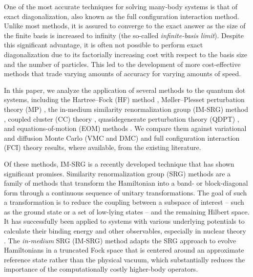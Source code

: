 One of the most accurate techniques for solving many-body systems is that of exact diagonalization, also known as the full configuration interaction method.  Unlike most methods, it is assured to converge to the exact answer as the size of the finite basis is increased to infinity (the so-called \textit{infinite-basis limit}).  Despite this significant advantage, it is often not possible to perform exact diagonalization due to its factorially increasing cost with respect to the basis size and the number of particles.  This led to the development of more cost-effective methods that trade varying amounts of accuracy for varying amounts of speed.

In this paper, we analyze the application of several methods to the quantum dot systems, including the Hartree--Fock (HF) method \cite{hartree_1928,Fock1930}, M\o ller--Plesset perturbation theory (MP) \cite{1934PhRv...46..618M}, the in-medium similarity renormalization group (IM-SRG) method \cite{IMSRG}, coupled cluster (CC) theory \cite{PhysRevB.67.045320,heidari:114708,PhysRevB.84.115302}, quasidegenerate perturbation theory (QDPT) \cite{0022-3700-7-18-010,Kvasnicka1974}, and equations-of-motion (EOM) methods \cite{RevModPhys.40.153}.  We compare them against variational and diffusion Monte Carlo (VMC and DMC) \cite{PhysRevB.68.035304,PhysRevB.62.8120,PhysRevB.84.115302,PhysRevB.54.4780} and full configuration interaction (FCI) theory \cite{olsen2013thesis,JJAP.36.3924,PhysRevB.56.6428,2008arXiv0810.2644K,rontani:124102} results, where available, from the existing literature.

Of these methods, IM-SRG is a recently developed technique that has shown significant promises.  Similarity renormalization group (SRG) methods \cite{PhysRevD.48.5863,PhysRevD.49.4214} are a family of methods that transform the Hamiltonian into a band- or block-diagonal form through a continuous sequence of unitary transformations.  The goal of such a transformation is to reduce the coupling between a subspace of interest -- such as the ground state or a set of low-lying states -- and the remaining Hilbert space.  It has successfully been applied to systems with various underlying potentials to calculate their binding energy and other observables, especially in nuclear theory \cite{ScottSRG,PhysRevC.75.061001,SRGThreeDim}.  The \emph{in-medium} SRG (IM-SRG) method adapts the SRG approach to evolve Hamiltonians in a truncated Fock space that is centered around an approximate reference state rather than the physical vacuum, which substantially reduces the importance of the computationally costly higher-body operators.

